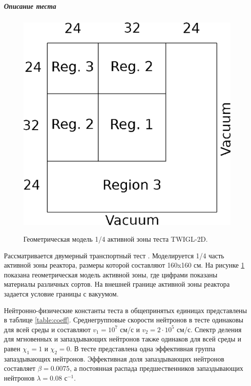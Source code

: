 \documentclass{crm-article}
\begin{document}
\subparagraph{Описание теста}
\begin{figure}[ht]
\begin{center}
	\includegraphics[width=0.4\linewidth]{twigl.eps}\\
	\caption{\label{image:canonsummary}Геометрическая модель 1/4 активной зоны теста TWIGL-2D.}
	\label{ris:twigl}
\end{center}
\end{figure}

Рассматривается двумерный транспортный тест \cite{hageman1969}. 
Моделируется 1/4 часть активной зоны реактора, размеры которой составляют 160x160 см.
На рисунке \ref{ris:twigl} показана геометрическая модель активной зоны, где цифрами показаны материалы различных сортов.
На внешней границе активной зоны реактора задается условие границы с вакуумом.  

Нейтронно-физические константы теста в общепринятых единицах представлены в таблице \ref{table:coeff}. 
Среднегрупповые скорости нейтронов в тесте одинаковы для всей среды и составляют $v_1 = 10^7$ см/с и $v_2 = 2 \cdot 10^5$ см/с. 
Спектр деления для мгновенных и запаздывающих нейтронов также одинаков для всей среды и равен $\chi_1 = 1$ и $\chi_2 = 0$.
В тесте представлена одна эффективная группа запаздывающих нейтронов. 
Эффективная доля запаздывающих нейтронов составляет $\beta = 0.0075$, а постоянная распада предшественников запаздывающих нейтронов $\lambda = 0.08$ с$^{-1}$. 
\end{document}
